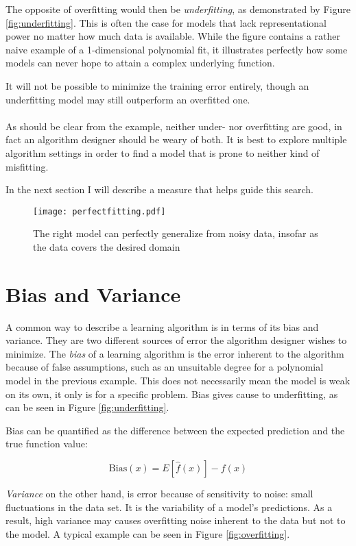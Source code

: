 The opposite of overfitting would then be \textit{underfitting},
as demonstrated by Figure \ref{fig:underfitting}.
This is often the case for models that lack
representational power
no matter how much data is available.
While the figure contains a rather naive example
of a 1-dimensional polynomial fit,
it illustrates perfectly how some models
can never hope to attain a complex underlying function.

It will not be possible to minimize the training error entirely,
though an underfitting model may still outperform
an overfitted one.

\paragraph{}
As should be clear from the example,
neither under- nor overfitting are good,
in fact an algorithm designer
should be weary of both.
It is best to explore multiple
algorithm settings in order to find
a model that is prone to
neither kind of misfitting.

In the next section I will describe a measure
that helps guide this search.

\begin{figure}[h]
\center
\texttt{[image: perfectfitting.pdf]}
\label{fig:perfectfitting}
\caption{The right model can perfectly generalize from noisy data,
insofar as the data covers the desired domain}
\end{figure}

\section{Bias and Variance}
A common way to describe a learning algorithm
is in terms of its
bias and variance.
They are two different sources of error
the algorithm designer wishes to minimize.
The \textit{bias} of a learning algorithm
is the error inherent to the algorithm
because of false assumptions,
such as an unsuitable degree for a polynomial model
in the previous example.
This does not necessarily mean the model is weak on its own,
it only is for a specific problem.
Bias gives cause to underfitting,
as can be seen in Figure \ref{fig:underfitting}.

Bias can be quantified as the difference
between the expected prediction
and the true function value:

$$
\text{Bias}(x) = E[\hat{f} (x)] - f(x)
$$

\textit{Variance}
on the other hand,
is error because of sensitivity to noise:
small fluctuations in the data set.
It is the variability of a model's predictions.
As a result,
high variance may causes overfitting
noise inherent to the data but not to the model.
A typical example can be seen in Figure \ref{fig:overfitting}.


